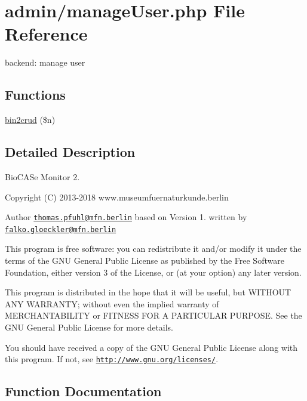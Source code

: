 \hypertarget{manage_user_8php}{}\section{admin/manage\+User.php File Reference}
\label{manage_user_8php}


backend\+: manage user  


\subsection*{Functions}
\begin{DoxyCompactItemize}
\item 
\hyperlink{manage_user_8php_ac4a74e72e3c7731da127516dd1265aae}{bin2crud} (\$n)
\end{DoxyCompactItemize}


\subsection{Detailed Description}
Bio\+C\+A\+Se Monitor 2. \begin{DoxyCopyright}{Copyright}
(C) 2013-\/2018 www.\+museumfuernaturkunde.\+berlin 
\end{DoxyCopyright}
\begin{DoxyAuthor}{Author}
\href{mailto:thomas.pfuhl@mfn.berlin}{\tt thomas.\+pfuhl@mfn.\+berlin} based on Version 1. written by \href{mailto:falko.gloeckler@mfn.berlin}{\tt falko.\+gloeckler@mfn.\+berlin}
\end{DoxyAuthor}
This program is free software\+: you can redistribute it and/or modify it under the terms of the G\+NU General Public License as published by the Free Software Foundation, either version 3 of the License, or (at your option) any later version.

This program is distributed in the hope that it will be useful, but W\+I\+T\+H\+O\+UT A\+NY W\+A\+R\+R\+A\+N\+TY; without even the implied warranty of M\+E\+R\+C\+H\+A\+N\+T\+A\+B\+I\+L\+I\+TY or F\+I\+T\+N\+E\+SS F\+OR A P\+A\+R\+T\+I\+C\+U\+L\+AR P\+U\+R\+P\+O\+SE. See the G\+NU General Public License for more details.

You should have received a copy of the G\+NU General Public License along with this program. If not, see \href{http://www.gnu.org/licenses/}{\tt http\+://www.\+gnu.\+org/licenses/}. 

\subsection{Function Documentation}
